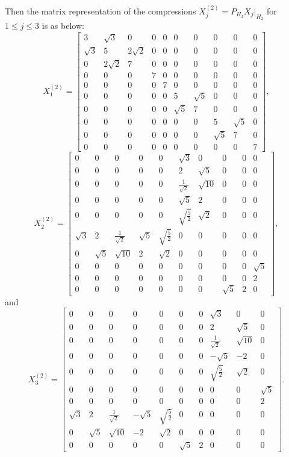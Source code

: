 \documentclass[11pt,reqno]{amsart}
\theoremstyle{plain}
\theoremstyle{definition}
\numberwithin{equation}{section}
\begin{document}
Then the matrix representation of the compressions $X^{(2)}_j = P_{H_2} X_j |_{H_2}$ for $1\leq j \leq 3$ is as below:
$$ X^{(2)}_1 = \begin{bmatrix}
3 & \sqrt{3} & 0 & 0 & 0 & 0 & 0 & 0 & 0 & 0 \\
\sqrt{3} & 5 & 2\sqrt{2} & 0 & 0 & 0 & 0 & 0 & 0 & 0 \\
0 & 2\sqrt{2} & 7 & 0 & 0 & 0 & 0 & 0 & 0 & 0 \\
0 & 0 & 0 & 7 & 0 & 0 & 0 & 0 & 0 & 0 \\
0 & 0 & 0 & 0 & 7 & 0 & 0 & 0 & 0 & 0 \\
0 & 0 & 0 & 0 & 0 & 5 & \sqrt{5} & 0 & 0 & 0 \\
0 & 0 & 0 & 0 & 0 & \sqrt{5} & 7 & 0 & 0 & 0 \\
0 & 0 & 0 & 0 & 0 & 0 & 0 & 5 & \sqrt{5} & 0 \\
0 & 0 & 0 & 0 & 0 & 0 & 0 & \sqrt{5} & 7 & 0 \\
0 & 0 & 0 & 0 & 0 & 0 & 0 & 0 & 0 & 7
\end{bmatrix}, 
$$
$$ 
X^{(2)}_2= \begin{bmatrix}
0 & 0 & 0 & 0 & 0 & \sqrt{3} & 0 & 0 & 0 & 0 \\
0 & 0 & 0 & 0 & 0 & 2 & \sqrt{5} & 0 & 0 & 0 \\
0 & 0 & 0 & 0 & 0 & \frac{1}{\sqrt{2}} & \sqrt{10} & 0 & 0 & 0 \\
0 & 0 & 0 & 0 & 0 & \sqrt{5} & 2 & 0 & 0 & 0 \\
0 & 0 & 0 & 0 & 0 & \sqrt{\frac{5}{2}} & \sqrt{2} & 0 & 0 & 0 \\
\sqrt{3} & 2 & \frac{1}{\sqrt{2}} & \sqrt{5} & \sqrt{\frac{5}{2}} & 0 & 0 & 0 & 0 & 0 \\
0 & \sqrt{5} & \sqrt{10} & 2 & \sqrt{2} & 0 & 0 & 0 & 0 & 0 \\
0 & 0 & 0 & 0 & 0 & 0 & 0 & 0 & 0 & \sqrt{5} \\
0 & 0 & 0 & 0 & 0 & 0 & 0 & 0 & 0 & 2 \\
0 & 0 & 0 & 0 & 0 & 0 & 0 & \sqrt{5} & 2 & 0
\end{bmatrix}, 
$$
and
$$
X^{(2)}_3= \begin{bmatrix}
0 & 0 & 0 & 0 & 0 & 0 & 0 & \sqrt{3} & 0 & 0 \\
0 & 0 & 0 & 0 & 0 & 0 & 0 & 2 & \sqrt{5} & 0 \\
0 & 0 & 0 & 0 & 0 & 0 & 0 & \frac{1}{\sqrt{2}} & \sqrt{10} & 0 \\
0 & 0 & 0 & 0 & 0 & 0 & 0 & -\sqrt{5} & -2 & 0 \\
0 & 0 & 0 & 0 & 0 & 0 & 0 & \sqrt{\frac{5}{2}} & \sqrt{2} & 0 \\
0 & 0 & 0 & 0 & 0 & 0 & 0 & 0 & 0 & \sqrt{5} \\
0 & 0 & 0 & 0 & 0 & 0 & 0 & 0 & 0 & 2 \\
\sqrt{3} & 2 & \frac{1}{\sqrt{2}} & -\sqrt{5} & \sqrt{\frac{5}{2}} & 0 & 0 & 0 & 0 & 0 \\
0 & \sqrt{5} & \sqrt{10} & -2 & \sqrt{2} & 0 & 0 & 0 & 0 & 0 \\
0 & 0 & 0 & 0 & 0 & \sqrt{5} & 2 & 0 & 0 & 0
\end{bmatrix}. 
$$
\end{document}
